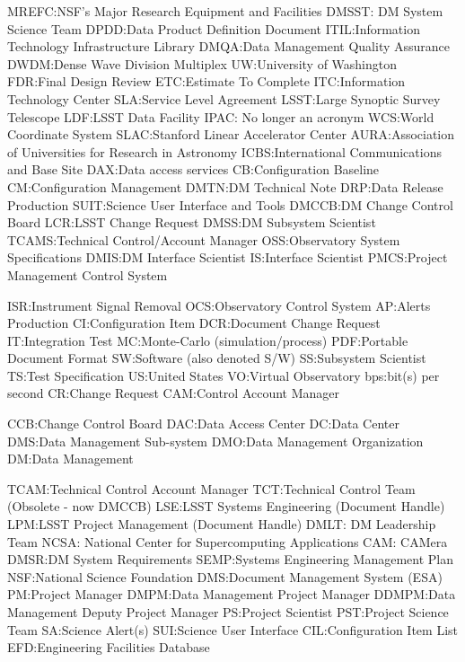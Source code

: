 MREFC:NSF's Major Research Equipment and Facilities
DMSST: DM System Science Team
DPDD:Data Product Definition Document
ITIL:Information Technology Infrastructure Library
DMQA:Data Management Quality Assurance
DWDM:Dense Wave Division Multiplex
UW:University of Washington
FDR:Final Design Review
ETC:Estimate To Complete
ITC:Information Technology Center
SLA:Service Level Agreement
LSST:Large Synoptic Survey Telescope
LDF:LSST Data Facility
IPAC: No longer an acronym
WCS:World Coordinate System
SLAC:Stanford Linear Accelerator Center
AURA:Association of Universities for Research in Astronomy
ICBS:International Communications and Base Site
DAX:Data access services
CB:Configuration Baseline
CM:Configuration Management
DMTN:DM Technical Note
DRP:Data Release Production
SUIT:Science User Interface and Tools
DMCCB:DM Change Control Board
LCR:LSST Change Request
DMSS:DM Subsystem Scientist
TCAMS:Technical Control/Account Manager
OSS:Observatory System Specifications
DMIS:DM Interface Scientist
IS:Interface Scientist
PMCS:Project Management Control System

ISR:Instrument Signal Removal
OCS:Observatory Control System
AP:Alerts Production
CI:Configuration Item
DCR:Document Change Request
IT:Integration Test
MC:Monte-Carlo (simulation/process)
PDF:Portable Document Format
SW:Software (also denoted S/W)
SS:Subsystem Scientist
TS:Test Specification
US:United States
VO:Virtual Observatory
bps:bit(s) per second
CR:Change Request
CAM:Control Account Manager

CCB:Change Control Board
DAC:Data Access Center
DC:Data Center
DMS:Data Management Sub-system
DMO:Data Management Organization
DM:Data Management

TCAM:Technical Control Account Manager
TCT:Technical Control Team (Obsolete - now DMCCB)
LSE:LSST Systems Engineering (Document Handle)
LPM:LSST Project Management (Document Handle)
DMLT: DM Leadership Team
NCSA: National Center for Supercomputing Applications
CAM: CAMera
DMSR:DM System Requirements
SEMP:Systems Engineering Management Plan
NSF:National Science Foundation
DMS:Document Management System (ESA)
PM:Project Manager
DMPM:Data Management Project Manager
DDMPM:Data Management Deputy Project Manager
PS:Project Scientist
PST:Project Science Team
SA:Science Alert(s)
SUI:Science User Interface
CIL:Configuration Item List
EFD:Engineering Facilities Database
